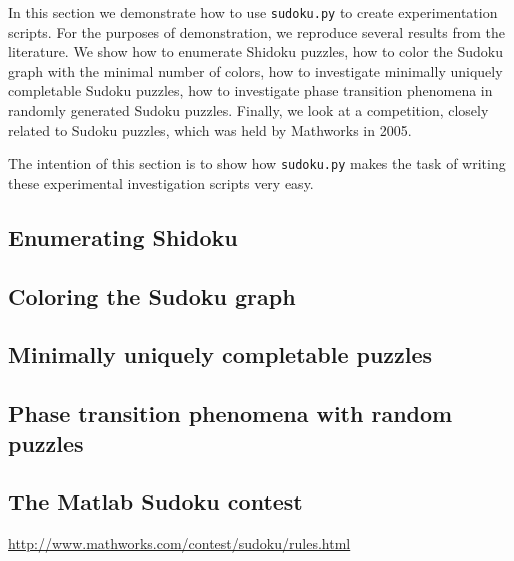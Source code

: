 In this section we demonstrate how to use \texttt{sudoku.py} to create experimentation scripts. For the purposes of demonstration, we reproduce several results from the literature. We show how to enumerate Shidoku puzzles, how to color the Sudoku graph with the minimal number of colors, how to investigate minimally uniquely completable Sudoku puzzles, how to investigate phase transition phenomena in randomly generated Sudoku puzzles. Finally, we look at a competition, closely related to Sudoku puzzles, which was held by Mathworks in 2005. 

The intention of this section is to show how \texttt{sudoku.py} makes the task of writing these experimental investigation scripts very easy.

\subsection{Enumerating Shidoku}
\label{sec:shidoku}



\subsection{Coloring the Sudoku graph}
\label{sec:coloring}

\subsection{Minimally uniquely completable puzzles}
\label{sec:minimal}

\subsection{Phase transition phenomena with random puzzles}
\label{sec:phase}

\cite{lewismetaheur}

\subsection{The Matlab Sudoku contest}
\label{sec:contest}

\url{http://www.mathworks.com/contest/sudoku/rules.html}

